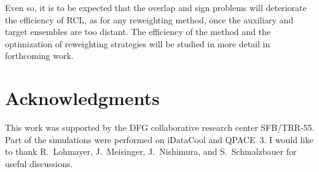 \documentclass[prd,showpacs,reprint,nofootinbib,showkeys]{revtex4-1}
\begin{document}
Even so, it is to be expected that the overlap and sign problems will deteriorate the efficiency of  RCL, as for any reweighting method, once the auxiliary and target ensembles are too distant. The efficiency of the method and the optimization of reweighting strategies will be studied in more detail in forthcoming work.



\section*{Acknowledgments}
This work was supported by the DFG collaborative research center SFB/TRR-55. Part of the simulations were performed on iDataCool and QPACE~3. I would like to thank R.~Lohmayer, J.~Meisinger, J.~Nishimura, and S.~Schmalzbauer for useful discussions.


 
\end{document}
